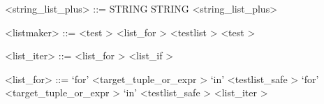 \label{stringzzzlistzzzplusb}

\begin{grammar}
<string_list_plus> ::= STRING
	\alt STRING <string_list_plus>
\end{grammar}


\label{listmakerb}

\begin{grammar}
<listmaker> ::= <test \myref[testb]> <list_for \myref[listzzzforb]>
	\alt <testlist \myref[testlistb]>
	\alt <test \myref[testb]>
\end{grammar}


\label{listzzziterb}

\begin{grammar}
<list_iter> ::= <list_for \myref[listzzzforb]>
	\alt <list_if \myref[listzzzifb]>
\end{grammar}


\label{listzzzforb}

\begin{grammar}
<list_for> ::= `for' <target_tuple_or_expr \myref[targetzzztuplezzzorzzzexprb]> `in' <testlist_safe \myref[testlistzzzsafeb]>
	\alt `for' <target_tuple_or_expr \myref[targetzzztuplezzzorzzzexprb]> `in' <testlist_safe \myref[testlistzzzsafeb]> <list_iter \myref[listzzziterb]>
\end{grammar}

